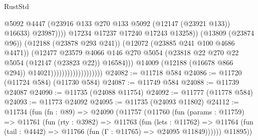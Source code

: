 \begin{lexlean}{RustStd}
\begin{coremodule}
                                                        @5092
                                                        @4447
                                                        (@23916
                                                          @133
                                                          @270
                                                          @133
                                                          @5092
                                                          (@12147 (@23921 @133))
                                                          @16633)
                                                        @23987))))
                                                @17234
                                                @17237
                                                @17240
                                                @17243
                                                @13258))
                                            (@13809 (@23874 @96))
                                            (@12188 (@23878 @293 @241))
                                            (@12072 (@23885 @241 @100 @4686 @4471))
                                            (@12477
                                              @23579
                                              @4066
                                              @146
                                              @270
                                              @5054
                                              (@23818
                                                @22
                                                @270
                                                @22
                                                @5054
                                                (@12147 (@23823 @22))
                                                @16584)))
                                          @14009
                                          (@12188 (@16678 @866 @294))
                                          @14021)))))))))))))))))))
@24082 := @11718 @584
@24086 := @11720 (@11724 @584) (@11730 @584)
@24087 := @11749 @584
@24088 := @11739 @24087
@24090 := @11735 (@24088 @11754)
@24092 := @11777 (@11778 @584)
@24093 := @11773 @24092
@24095 := @11735 (@24093 @11802)
@24112 := @11734
    (fun (fn : @89) =>
    @24090
      (@11757
        (@11760
          (fun (params : @11759) =>
          @11761
            (fun (rty : @3982) =>
            @11763
              (fun (lets : @11762) =>
              @11764 (fun (tail : @4442) => @11766 (fun (Γ : @11765) => @24095 @11849))))))
        @11895))

\end{coremodule}
\end{lexlean}
